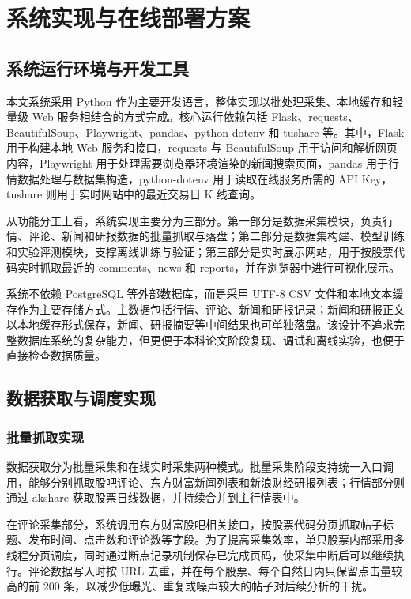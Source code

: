 
\chapter{系统实现与在线部署方案}

\section{系统运行环境与开发工具}

本文系统采用 Python 作为主要开发语言，整体实现以批处理采集、本地缓存和轻量级 Web 服务相结合的方式完成。核心运行依赖包括 Flask、requests、BeautifulSoup、Playwright、pandas、python-dotenv 和 tushare 等。其中，Flask 用于构建本地 Web 服务和接口，requests 与 BeautifulSoup 用于访问和解析网页内容，Playwright 用于处理需要浏览器环境渲染的新闻搜索页面，pandas 用于行情数据处理与数据集构造，python-dotenv 用于读取在线服务所需的 API Key，tushare 则用于实时网站中的最近交易日 K 线查询。

从功能分工上看，系统实现主要分为三部分。第一部分是数据采集模块，负责行情、评论、新闻和研报数据的批量抓取与落盘；第二部分是数据集构建、模型训练和实验评测模块，支撑离线训练与验证；第三部分是实时展示网站，用于按股票代码实时抓取最近的 comments、news 和 reports，并在浏览器中进行可视化展示。

系统不依赖 PostgreSQL 等外部数据库，而是采用 UTF-8 CSV 文件和本地文本缓存作为主要存储方式。主数据包括行情、评论、新闻和研报记录；新闻和研报正文以本地缓存形式保存，新闻、研报摘要等中间结果也可单独落盘。该设计不追求完整数据库系统的复杂能力，但更便于本科论文阶段复现、调试和离线实验，也便于直接检查数据质量。

\section{数据获取与调度实现}

\subsection{批量抓取实现}

数据获取分为批量采集和在线实时采集两种模式。批量采集阶段支持统一入口调用，能够分别抓取股吧评论、东方财富新闻列表和新浪财经研报列表；行情部分则通过 akshare 获取股票日线数据，并持续合并到主行情表中。

在评论采集部分，系统调用东方财富股吧相关接口，按股票代码分页抓取帖子标题、发布时间、点击数和评论数等字段。为了提高采集效率，单只股票内部采用多线程分页调度，同时通过断点记录机制保存已完成页码，使采集中断后可以继续执行。评论数据写入时按 URL 去重，并在每个股票、每个自然日内只保留点击量较高的前 200 条，以减少低曝光、重复或噪声较大的帖子对后续分析的干扰。

